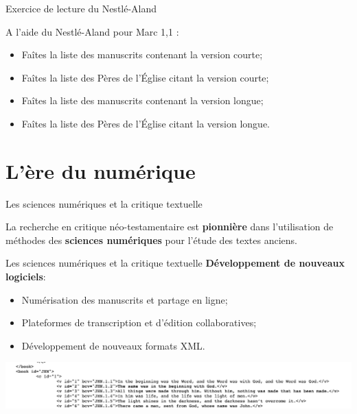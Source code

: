\documentclass[11pt]{beamer}
\begin{document}
\begin{frame}{Exercice de lecture du Nestlé-Aland}
\begin{block}{}
    A l'aide du Nestlé-Aland pour Marc 1,1 :
    \begin{itemize}
        \item Faîtes la liste des manuscrits contenant la version courte;
        \item Faîtes la liste des Pères de l’Église citant la version courte;
        \item Faîtes la liste des manuscrits contenant la version longue;
        \item Faîtes la liste des Pères de l’Église citant la version longue.
    \end{itemize}
\end{block}

\end{frame}

\section{L'ère du numérique}

\begin{frame}{Les sciences numériques et la critique textuelle}
    \begin{alertblock}{}
        La recherche en critique néo-testamentaire est \textbf{pionnière} dans l'utilisation de méthodes des \textbf{sciences numériques} pour l'étude des textes anciens. 
    \end{alertblock}
\end{frame}

\begin{frame}{Les sciences numériques et la critique textuelle}
    \textbf{Développement de nouveaux logiciels}:
    \begin{itemize}
        \item Numérisation des manuscrits et partage en ligne;
        \item Plateformes de transcription et d'édition collaboratives;
        \item Développement de nouveaux formats XML.
    \end{itemize}
        \vfill
        \includegraphics[width=\linewidth]{img/john_xml.png}
\end{frame}
\end{document}
